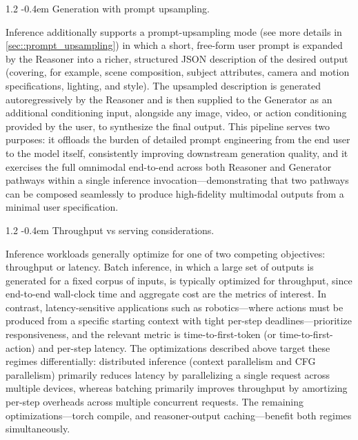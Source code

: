 \documentclass{llmxive}
\makeatletter
\providecommand{\paragraph}{  \@startsection{paragraph}{4}{\z@}    {1\baselineskip \@plus .2\baselineskip}    {-0.4em}    {\normalfont\normalsize\bfseries}}
\makeatother
\begin{document}
\paragraph{Generation with prompt upsampling.}

Inference additionally supports a prompt-upsampling mode (see more details in \cref{sec::prompt_upsampling}) in which a short, free-form user prompt is expanded by the Reasoner into a richer, structured JSON description of the desired output (covering, for example, scene composition, subject attributes, camera and motion specifications, lighting, and style). The upsampled description is generated autoregressively by the Reasoner and is then supplied to the Generator as an additional conditioning input, alongside any image, video, or action conditioning provided by the user, to synthesize the final output. This pipeline serves two purposes: it offloads the burden of detailed prompt engineering from the end user to the model itself, consistently improving downstream generation quality, and it exercises the full omnimodal end-to-end across both Reasoner and Generator pathways within a single inference invocation---demonstrating that two pathways can be composed seamlessly to produce high-fidelity multimodal outputs from a minimal user specification.

\paragraph{Throughput vs serving considerations.}

Inference workloads generally optimize for one of two competing objectives: throughput or latency. Batch inference, in which a large set of outputs is generated for a fixed corpus of inputs, is typically optimized for throughput, since end-to-end wall-clock time and aggregate cost are the metrics of interest. In contrast, latency-sensitive applications such as robotics---where actions must be produced from a specific starting context with tight per-step deadlines---prioritize responsiveness, and the relevant metric is time-to-first-token (or time-to-first-action) and per-step latency. The optimizations described above target these regimes differentially: distributed inference (context parallelism and CFG parallelism) primarily reduces latency by parallelizing a single request across multiple devices, whereas batching primarily improves throughput by amortizing per-step overheads across multiple concurrent requests. The remaining optimizations---torch compile, and reasoner-output caching---benefit both regimes simultaneously.
\end{document}
